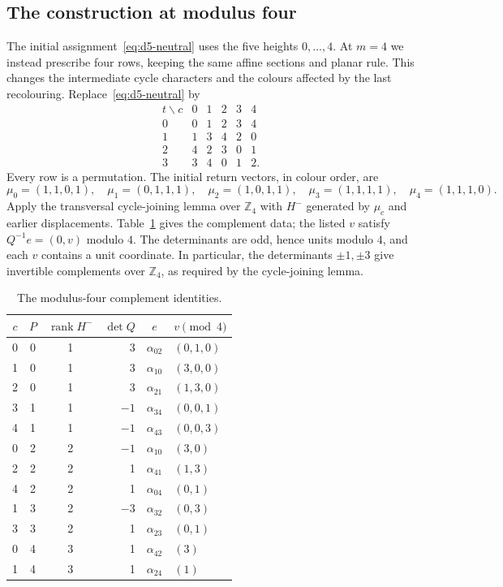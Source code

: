 \documentclass[11pt,reqno]{amsart}
\numberwithin{equation}{section}
\theoremstyle{definition}
\theoremstyle{remark}
\begin{document}
\subsection{The construction at modulus four}
The initial assignment~\eqref{eq:d5-neutral} uses the five heights
$0,\ldots,4$. At $m=4$ we instead prescribe four rows, keeping the same
affine sections and planar rule. This changes the intermediate cycle
characters and the colours affected by the last recolouring.
Replace~\eqref{eq:d5-neutral} by
\begin{equation}\label{eq:d5four-schedule}
\begin{array}{c|ccccc}
 t\backslash c&0&1&2&3&4\\\hline
 0&0&1&2&3&4\\
 1&1&3&4&2&0\\
 2&4&2&3&0&1\\
 3&3&4&0&1&2.
\end{array}
\end{equation}
Every row is a permutation. The initial return vectors, in colour order, are
\[
 \mu_0=(1,1,0,1),\quad\mu_1=(0,1,1,1),\quad\mu_2=(1,0,1,1),\quad
 \mu_3=(1,1,1,1),\quad\mu_4=(1,1,1,0).
\]
Apply the transversal cycle-joining lemma over $\mathbb Z_4$ with $H^-$ generated by $\mu_c$
and earlier displacements. Table~\ref{tab:d5four-cert} gives the complement
data; the listed $v$ satisfy $Q^{-1}e=(0,v)$ modulo $4$. The determinants are
odd, hence units modulo $4$, and each $v$ contains a unit coordinate. In
particular, the determinants $\pm1,\pm3$ give invertible complements over
$\mathbb Z_4$, as required by the cycle-joining lemma.
\begin{table}[htbp]
\centering\small
\caption{The modulus-four complement identities.}\label{tab:d5four-cert}
\begin{tabular}{cccrcl}
\toprule
$c$&$P$&$\operatorname{rank}H^-$&$\det Q$&$e$&$v\pmod4$\\\midrule
0&0&1&3&$\alpha_{02}$&$(0,1,0)$\\
1&0&1&3&$\alpha_{10}$&$(3,0,0)$\\
2&0&1&3&$\alpha_{21}$&$(1,3,0)$\\
3&1&1&$-1$&$\alpha_{34}$&$(0,0,1)$\\
4&1&1&$-1$&$\alpha_{43}$&$(0,0,3)$\\
0&2&2&$-1$&$\alpha_{10}$&$(3,0)$\\
2&2&2&1&$\alpha_{41}$&$(1,3)$\\
4&2&2&1&$\alpha_{04}$&$(0,1)$\\
1&3&2&$-3$&$\alpha_{32}$&$(0,3)$\\
3&3&2&1&$\alpha_{23}$&$(0,1)$\\
0&4&3&1&$\alpha_{42}$&$(3)$\\
1&4&3&1&$\alpha_{24}$&$(1)$\\\bottomrule
\end{tabular}
\end{table}
\end{document}
